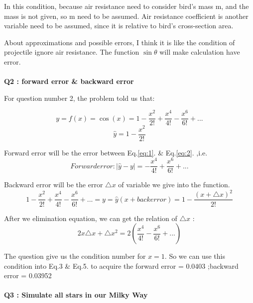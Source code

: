\documentclass{article}
\begin{document}
In this condition, because air resistance need to consider bird's mass m, and the mass is not given, so m need to be assumed. Air resistance coefficient is another variable need to be assumed, since it is relative to bird's cross-section area.

About approximations and possible errors, I think it is like the condition of projectile ignore air resistance. The function $\sin{\theta}$ will make calculation have error.
\\ \\

\textbf{Q2 : forward error \& backward error\\}

For question number 2, the problem told us that:

\begin{equation}
    y=f(x)=\cos (x)=1-\frac{x^2}{2!}+\frac{x^4}{4!}-\frac{x^6}{6!}+...
    \label{eq:1}
\end{equation}
\begin{equation}
    \hat{y}= 1-\frac{x^2}{2!}
    \label{eq:2}
\end{equation}


Forward error will be the error between Eq.\ref{eq:1}. \& Eq.\ref{eq:2}. ,i.e.
\begin{equation}
Forward error : \left|\hat{y}-y\right| = -\frac{x^4}{4!}+\frac{x^6}{6!}+...
\label{eq:3}
\end{equation}

Backward error will be the error $\triangle x$ of variable we give into the function.
\begin{equation}
    1-\frac{x^2}{2!}+\frac{x^4}{4!}-\frac{x^6}{6!}+...=y=\hat{y}(x+back error)=1-\frac{(x+\triangle x)^2}{2!}
    \label{eq:4}
\end{equation}

After we elimination equation, we can get the relation of $\triangle x$ :
\begin{equation}
    2x\triangle x +\triangle x^2 = 2(\frac{x^4}{4!}-\frac{x^6}{6!}+...)
    \label{eq:5}
\end{equation}

The question give us the condition number for $x=1$. So we can use this condition into Eq.3 \& Eq.5. to acquire the forward error = 0.0403 ;backward error = 0.03952\\ \\
\textbf{Q3 : Simulate all stars in our Milky Way}
\end{document}
